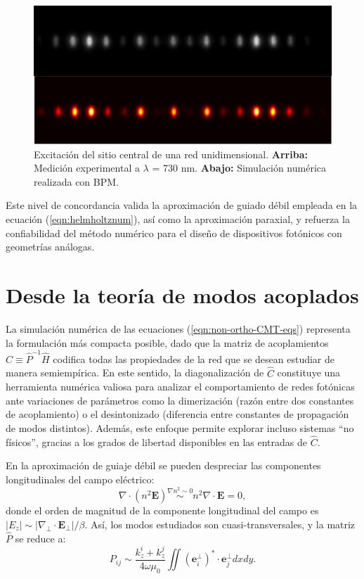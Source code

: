 \begin{figure}[H]
\centering
\includegraphics[width=0.6\linewidth]{media/num_exp_comparison.png}
\caption[Excitación del sitio central de una red unidimensional.]{
Excitación del sitio central de una red unidimensional.
\textbf{Arriba:} Medición experimental a $\lambda$ = 730 nm.
\textbf{Abajo:} Simulación numérica realizada con BPM.
\label{fig:num-exp-comp}
}
\end{figure}

Este nivel de concordancia valida la aproximación de guiado débil empleada en la ecuación (\ref{eqn:helmholtznum}), así como la aproximación paraxial, y refuerza la confiabilidad del método numérico para el diseño de dispositivos fotónicos con geometrías análogas.


\section{Desde la teoría de modos acoplados}

La simulación numérica de las ecuaciones (\ref{eqn:non-ortho-CMT-eqs}) representa la formulación más compacta posible, dado que la matriz de acoplamientos $\hat{C} \equiv \hat{P}^{-1}\hat{H}$ codifica todas las propiedades de la red que se desean estudiar de manera semiempírica. En este sentido, la diagonalización de $\hat{C}$ constituye una herramienta numérica valiosa para analizar el comportamiento de redes fotónicas ante variaciones de parámetros como la dimerización (razón entre dos constantes de acoplamiento) o el desintonizado (diferencia entre constantes de propagación de modos distintos). Además, este enfoque permite explorar incluso sistemas ``no físicos'', gracias a los grados de libertad disponibles en las entradas de $\hat{C}$.

En la aproximación de guiaje débil se pueden despreciar las componentes longitudinales del campo eléctrico:
\[ \nabla \cdot (n^2 \textbf{E}) \overset{\nabla n^2 \sim 0}{\sim} n^2 \nabla \cdot \textbf{E} = 0,\]
donde el orden de magnitud de la componente longitudinal del campo es $|E_z| \sim |\nabla_\perp \cdot \textbf{E}_\perp|/\beta$. Así, los modos estudiados son cuasi-transversales, y la matriz $\hat{P}$ se reduce a:
\begin{equation}
    P_{ij} \sim \frac{k_z^i + k_z^j}{4\omega\mu_0} \iint \left(\textbf{e}_i^\perp\right)^* \cdot \textbf{e}_j^\perp dxdy.
    \label{eqn:CMTnum}
\end{equation}

